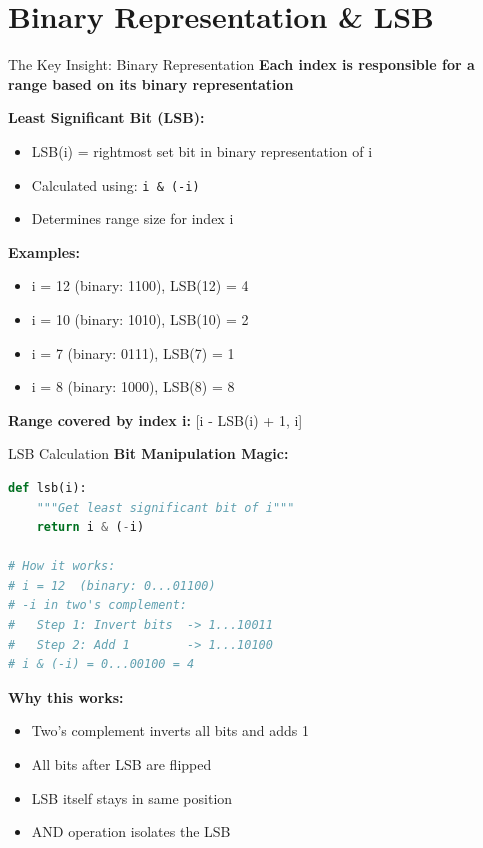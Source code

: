 \documentclass[aspectratio=169]{beamer}
\begin{document}
\section{Binary Representation \& LSB}

\begin{frame}{The Key Insight: Binary Representation}
  \textbf{Each index is responsible for a range based on its binary representation}

  \vspace{0.5cm}
  \textbf{Least Significant Bit (LSB):}
  \begin{itemize}
    \item LSB(i) = rightmost set bit in binary representation of i
    \item Calculated using: \texttt{i \& (-i)}
    \item Determines range size for index i
  \end{itemize}

  \vspace{0.5cm}
  \textbf{Examples:}
  \begin{itemize}
    \item i = 12 (binary: 1100), LSB(12) = 4
    \item i = 10 (binary: 1010), LSB(10) = 2
    \item i = 7 (binary: 0111), LSB(7) = 1
    \item i = 8 (binary: 1000), LSB(8) = 8
  \end{itemize}

  \vspace{0.5cm}
  \textbf{Range covered by index i:} [i - LSB(i) + 1, i]
\end{frame}

\begin{frame}[fragile]{LSB Calculation}
  \textbf{Bit Manipulation Magic:}

  \begin{lstlisting}[language=Python, basicstyle=\ttfamily\footnotesize]
def lsb(i):
    """Get least significant bit of i"""
    return i & (-i)

# How it works:
# i = 12  (binary: 0...01100)
# -i in two's complement:
#   Step 1: Invert bits  -> 1...10011
#   Step 2: Add 1        -> 1...10100
# i & (-i) = 0...00100 = 4
  \end{lstlisting}

  \vspace{0.5cm}
  \textbf{Why this works:}
  \begin{itemize}
    \item Two's complement inverts all bits and adds 1
    \item All bits after LSB are flipped
    \item LSB itself stays in same position
    \item AND operation isolates the LSB
  \end{itemize}
\end{frame}
\end{document}
